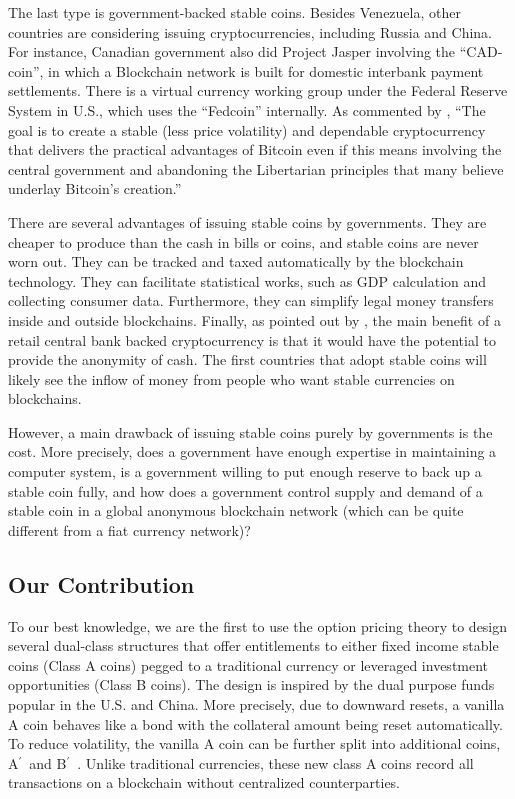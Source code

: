 \documentclass[draft, noinfoline]{ectaart}
\numberwithin{equation}{section}
\theoremstyle{plain}
\newcommand{\Ap}{A\ensuremath{^\prime}~}
\newcommand{\Bp}{B\ensuremath{^\prime}~}
\begin{document}
The last type is government-backed stable coins. Besides Venezuela, other countries are considering issuing cryptocurrencies, including Russia and China. For instance, Canadian government also did Project Jasper involving the ``CAD-coin'', in which a Blockchain network is built for domestic interbank payment settlements. There is a virtual currency working group under the Federal Reserve System in U.S., which uses the ``Fedcoin'' internally. As commented by \cite{garratt_cad-coin_2016}, ``The goal is to create a stable (less price volatility) and dependable cryptocurrency that delivers the practical advantages of Bitcoin even if this means involving the central government and abandoning the Libertarian principles that many believe underlay Bitcoin's creation.''

There are several advantages of issuing stable coins by governments. They are cheaper to produce than the cash in bills or coins, and stable coins are never worn out. They can be tracked and taxed automatically by the blockchain technology. They can facilitate statistical works, such as GDP calculation and collecting consumer data. Furthermore, they can simplify legal money transfers inside and outside blockchains. Finally, as pointed out by \cite{bech_central_2017}, the main benefit of a retail central bank backed cryptocurrency is that it would have the potential to provide the anonymity of cash. The first countries that adopt stable coins will likely see the inflow of money from people who want stable currencies on blockchains.

However, a main drawback of issuing stable coins purely by governments is the cost. More precisely, does a government have enough expertise in maintaining a computer system, is a government willing to put enough reserve to back up a stable coin fully, and  how does a government control supply and demand of a stable coin in a global anonymous blockchain network (which can be quite different from a fiat currency network)?



\subsection{Our Contribution}

To our best knowledge, we are the first to use the option pricing theory to design several dual-class structures that offer entitlements to either fixed income stable coins (Class A coins) pegged to a traditional currency or leveraged investment opportunities (Class B coins).  The design is inspired by the dual purpose funds popular in the U.S. and China. More precisely, due to downward resets, a vanilla A coin behaves like a bond with the collateral amount being reset automatically. To reduce volatility, the vanilla A coin can be further split into additional coins, \Ap and \Bp. Unlike traditional currencies, these new class A coins record all transactions on a blockchain without centralized counterparties.
\end{document}
